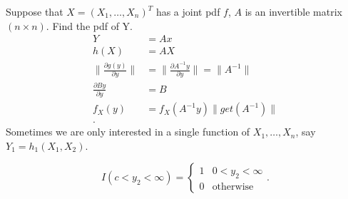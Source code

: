\begin{example}
	Suppose that $X = \left( X_{1} , \ldots , X_{n} \right) ^{T}$ has a joint pdf $f$, $A$ is an invertible matrix $\left( n \times  n \right) $. Find the pdf of Y. 
	\begin{align*}
		Y &= Ax \\
		h\left( X \right)  &=  AX \\
		\|\frac{\partial g\left( y \right) }{\partial y} \| &= \|\frac{\partial A^{-1}y}{\partial y}\| = \|A^{-1}\|  \\
		\frac{\partial By}{\partial y} &= B \\
		f_X\left( y \right) &= f_{X} \left( A^{-1}y \right) \|get\left( A^{-1} \right) \|\\
	.\end{align*}
	Sometimes we are only interested in a  single function of $X_{1} , \ldots , X_{n}$, say $Y_1 = h_1\left( X_1, X_2 \right) $. 
	\begin{note}
		\[
			I\left( c < y_2 < \infty \right) = \begin{cases}
				1 & 0 < y_2 < \infty\\
				0 & \text{otherwise}
			\end{cases}
		.\] 
	\end{note}

\end{example}
 
